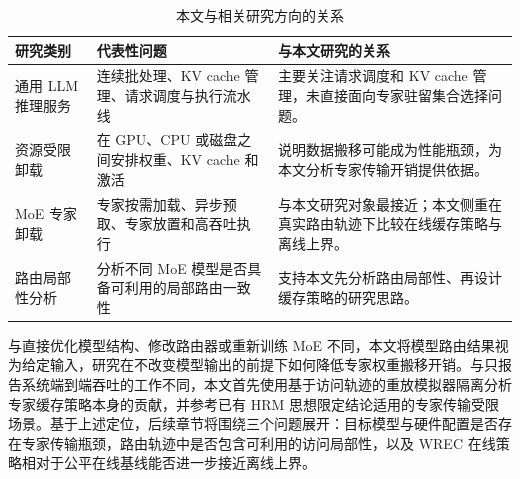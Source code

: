 \begin{table}[ht]
    \centering
    \caption{\label{tab:related-work-position}本文与相关研究方向的关系}
    \begin{tabularx}{\linewidth}{lXX}
        \hline
        研究类别 & 代表性问题 & 与本文研究的关系 \\ \hline
        通用 LLM 推理服务 & 连续批处理、KV cache 管理、请求调度与执行流水线~\cite{yu2022orca,kwon2023pagedattention} & 主要关注请求调度和 KV cache 管理，未直接面向专家驻留集合选择问题。 \\ \hline
        资源受限卸载 & 在 GPU、CPU 或磁盘之间安排权重、KV cache 和激活~\cite{sheng2023flexgen,song2023powerinfer} & 说明数据搬移可能成为性能瓶颈，为本文分析专家传输开销提供依据。 \\ \hline
        MoE 专家卸载 & 专家按需加载、异步预取、专家放置和高吞吐执行~\cite{eliseev2023offloading,xue2024moeinfinity,kamahori2024fiddler,cao2025moelightning} & 与本文研究对象最接近；本文侧重在真实路由轨迹下比较在线缓存策略与离线上界。 \\ \hline
        路由局部性分析 & 分析不同 MoE 模型是否具备可利用的局部路由一致性~\cite{liang2026notallmodels} & 支持本文先分析路由局部性、再设计缓存策略的研究思路。 \\ \hline
    \end{tabularx}
\end{table}

与直接优化模型结构、修改路由器或重新训练 MoE 不同，本文将模型路由结果视为给定输入，研究在不改变模型输出的前提下如何降低专家权重搬移开销。与只报告系统端到端吞吐的工作不同，本文首先使用基于访问轨迹的重放模拟器隔离分析专家缓存策略本身的贡献，并参考已有 HRM 思想限定结论适用的专家传输受限场景。基于上述定位，后续章节将围绕三个问题展开：目标模型与硬件配置是否存在专家传输瓶颈，路由轨迹中是否包含可利用的访问局部性，以及 WREC 在线策略相对于公平在线基线能否进一步接近离线上界。
